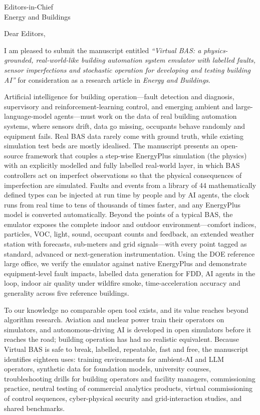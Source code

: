 \documentclass[11pt]{letter}
\begin{document}
\begin{letter}{Editors-in-Chief\\Energy and Buildings}
\opening{Dear Editors,}

I am pleased to submit the manuscript entitled \emph{``Virtual BAS: a physics-grounded, real-world-like building
automation system emulator with labelled faults, sensor imperfections and stochastic operation for developing and
testing building AI''} for consideration as a research article in \emph{Energy and Buildings}.

Artificial intelligence for building operation---fault detection and diagnosis, supervisory and reinforcement-learning
control, and emerging ambient and large-language-model agents---must work on the data of real building automation
systems, where sensors drift, data go missing, occupants behave randomly and equipment fails. Real BAS data rarely come
with ground truth, while existing simulation test beds are mostly idealised. The manuscript presents an open-source
framework that couples a step-wise EnergyPlus simulation (the physics) with an explicitly modelled and fully labelled
real-world layer, in which BAS controllers act on imperfect observations so that the physical consequences of
imperfection are simulated. Faults and events from a library of 44 mathematically defined types can be injected at run
time by people and by AI agents, the clock runs from real time to tens of thousands of times faster, and any EnergyPlus
model is converted automatically. Beyond the points of a typical BAS, the emulator exposes the complete indoor and
outdoor environment---comfort indices, particles, VOC, light, sound, occupant counts and feedback, an extended weather
station with forecasts, sub-meters and grid signals---with every point tagged as standard, advanced or
next-generation instrumentation. Using the DOE reference large office, we verify the emulator against native
EnergyPlus and demonstrate equipment-level fault impacts, labelled data generation for FDD, AI agents in the loop, indoor air quality under wildfire smoke,
time-acceleration accuracy and generality across five reference buildings.

To our knowledge no comparable open tool exists, and its value reaches beyond algorithm research. Aviation and
nuclear power train their operators on simulators, and autonomous-driving AI is developed in open simulators before it
reaches the road; building operation has had no realistic equivalent. Because Virtual BAS is safe to break, labelled,
repeatable, fast and free, the manuscript identifies eighteen uses: training environments for ambient-AI and LLM
operators, synthetic data for foundation models, university courses, troubleshooting drills for building operators
and facility managers, commissioning practice, neutral testing of commercial analytics products, virtual
commissioning of control sequences, cyber-physical security and grid-interaction studies, and shared benchmarks.


\end{letter}
\end{document}

